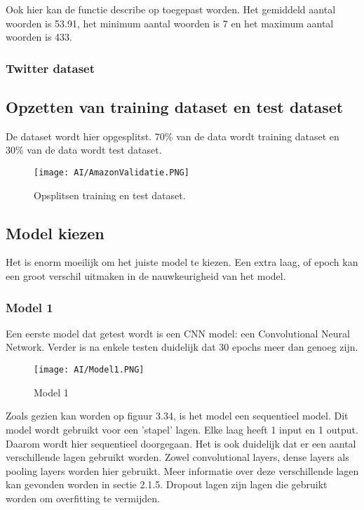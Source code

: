 Ook hier kan de functie describe op toegepast worden. Het gemiddeld aantal woorden is 53.91, het minimum aantal woorden is 7 en het maximum aantal woorden is 433.  


\subsubsection{Twitter dataset} 

\subsection{Opzetten van training dataset en test dataset}
De dataset wordt hier opgesplitst. 70\% van de data wordt training dataset en 30\% van de data wordt test dataset.

\begin{figure}[!htbp]
    \texttt{[image: AI/AmazonValidatie.PNG]}
    \caption{\label{amazonopsplitsing}Opsplitsen training en test dataset.}
\end{figure}
\FloatBarrier

\subsection{Model kiezen}
\label{proofofconceptdatamodel}
Het is enorm moeilijk om het juiste model te kiezen. Een extra laag, of epoch kan een groot verschil uitmaken in de nauwkeurigheid van het model. 

\subsubsection{Model 1}

Een eerste model dat getest wordt is een CNN model: een Convolutional Neural Network. Verder is na enkele testen duidelijk dat 30 epochs meer dan genoeg zijn. 

\begin{figure}[!htbp]
    \texttt{[image: AI/Model1.PNG]}
    \caption{\label{model1}Model 1}
\end{figure}
\FloatBarrier

Zoals gezien kan worden op figuur 3.34, is het model een sequentieel model. Dit model wordt gebruikt voor een 'stapel' lagen. Elke laag heeft 1 input en 1 output. Daarom wordt hier sequentieel doorgegaan. Het is ook duidelijk dat er een aantal verschillende lagen gebruikt worden. Zowel convolutional layers, dense layers als pooling layers worden hier gebruikt. Meer informatie over deze verschillende lagen kan gevonden worden in sectie 2.1.5. Dropout lagen zijn lagen die gebruikt worden om overfitting te vermijden.

